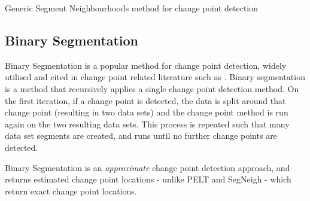 \documentclass{uvamscse}	%
\begin{document}
\begin{algorithm}[H]
\label{alg:segneigh}
    \caption{Generic Segment Neighbourhoods method for change point detection}
    \DontPrintSemicolon
        
        
\end{algorithm}

\subsection{Binary Segmentation}

Binary Segmentation is a popular method for change point detection, widely utilised and cited in change point related literature such as . Binary segmentation is a method that recursively applies a single change point detection method. On the first iteration, if a change point is detected, the data is split around that change point (resulting in two data sets) and the change point method is run again on the two resulting data sets. This process is repeated such that many data set segments are created, and runs until no further change points are detected.

Binary Segmentation is an \emph{approximate} change point detection approach, and returns estimated change point locations - unlike PELT and SegNeigh - which return exact change point locations.
\end{document}
